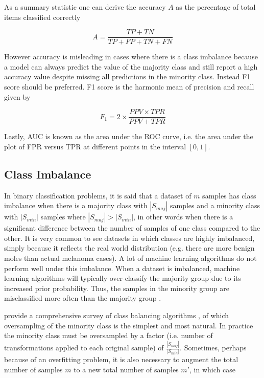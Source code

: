 As a summary statistic one can derive the accuracy $A$ as the percentage of total items classified correctly

$$
A = \frac{TP + TN}{TP + FP + TN + FN}
$$

However accuracy is misleading in cases where there is a class imbalance because a model can always predict the value of the majority class and still report a high accuracy value despite missing all predictions in the minority class. Instead F1 score should be preferred. F1 score is the harmonic mean of precision and recall given by

$$
F_1 = 2 \times \frac{PPV \times TPR}{PPV + TPR}
$$

Lastly, \ac{AUC} is known as the area under the \ac{ROC} curve, i.e. the area under the plot of \ac{FPR} versus \ac{TPR} at different points in the interval $[0, 1]$.

\subsection{Class Imbalance}

In binary classification problems, it is said that a dataset of $m$ samples has class imbalance when there is a majority class with $|S_{maj}|$ samples and a minority class with $|S_{min}|$ samples where $|S_{maj}| > |S_{min}|$, in other words when there is a significant difference between the number of samples of one class compared to the other. It is very common to see datasets in which classes are highly imbalanced, simply because it reflects the real world distribution (e.g. there are more benign moles than actual melanoma cases). A lot of machine learning algorithms do not perform well under this imbalance. When a dataset is imbalanced, machine learning algorithms will typically over-classify the majority group due to its increased prior probability. Thus, the samples in the minority group are misclassified more often than the majority group \cite{Johnson2019}.

\citeauthor{haibo2009} provide a comprehensive survey of class balancing algorithms \cite{haibo2009}, of which oversampling of the minority class is the simplest and most natural. In practice the minority class must be oversampled by a factor (i.e. number of transformations applied to each original sample) of $\frac{|S_{maj}|}{|S_{min}|}$. Sometimes, perhaps because of an overfitting problem, it is also necessary to augment the total number of samples $m$ to a new total number of samples $m'$, in which case

